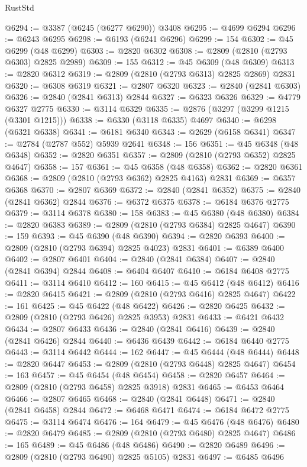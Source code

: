 \begin{lexlean}{RustStd}
\begin{coremodule}
{\begin{coremodule}
{{{{{{{{{{{{{{{{{{{{{{{{{{{{{{{{{@6294 := @3387 (@6245 (@6277 @6290)) @3408
@6295 := @4699 @6294
@6296 := @6243 @6295
@6298 := @6193 (@6241 @6296)
@6299 := 154
@6302 := @45 @6299 (@48 @6299)
@6303 := @2820 @6302
@6308 := @2809 (@2810 (@2793 @6303) @2825 @2989)
@6309 := 155
@6312 := @45 @6309 (@48 @6309)
@6313 := @2820 @6312
@6319 := @2809 (@2810 (@2793 @6313) @2825 @2869) @2831
@6320 := @6308 @6319
@6321 := @2807 @6320
@6323 := @2840 (@2841 @6303)
@6326 := @2840 (@2841 @6313) @2844
@6327 := @6323 @6326
@6329 := @4779 @6327 @2775
@6330 := @3114 @6329
@6335 := @2876 (@3297 (@3299 @1215 (@3301 @1215)))
@6338 := @6330 (@3118 @6335) @4697
@6340 := @6298 (@6321 @6338)
@6341 := @6181 @6340
@6343 := @2629 (@6158 @6341)
@6347 := @2784 (@2787 @552) @5939 @2641
@6348 := 156
@6351 := @45 @6348 (@48 @6348)
@6352 := @2820 @6351
@6357 := @2809 (@2810 (@2793 @6352) @2825 @4647)
@6358 := 157
@6361 := @45 @6358 (@48 @6358)
@6362 := @2820 @6361
@6368 := @2809 (@2810 (@2793 @6362) @2825 @4163) @2831
@6369 := @6357 @6368
@6370 := @2807 @6369
@6372 := @2840 (@2841 @6352)
@6375 := @2840 (@2841 @6362) @2844
@6376 := @6372 @6375
@6378 := @6184 @6376 @2775
@6379 := @3114 @6378
@6380 := 158
@6383 := @45 @6380 (@48 @6380)
@6384 := @2820 @6383
@6389 := @2809 (@2810 (@2793 @6384) @2825 @4647)
@6390 := 159
@6393 := @45 @6390 (@48 @6390)
@6394 := @2820 @6393
@6400 := @2809 (@2810 (@2793 @6394) @2825 @4023) @2831
@6401 := @6389 @6400
@6402 := @2807 @6401
@6404 := @2840 (@2841 @6384)
@6407 := @2840 (@2841 @6394) @2844
@6408 := @6404 @6407
@6410 := @6184 @6408 @2775
@6411 := @3114 @6410
@6412 := 160
@6415 := @45 @6412 (@48 @6412)
@6416 := @2820 @6415
@6421 := @2809 (@2810 (@2793 @6416) @2825 @4647)
@6422 := 161
@6425 := @45 @6422 (@48 @6422)
@6426 := @2820 @6425
@6432 := @2809 (@2810 (@2793 @6426) @2825 @3953) @2831
@6433 := @6421 @6432
@6434 := @2807 @6433
@6436 := @2840 (@2841 @6416)
@6439 := @2840 (@2841 @6426) @2844
@6440 := @6436 @6439
@6442 := @6184 @6440 @2775
@6443 := @3114 @6442
@6444 := 162
@6447 := @45 @6444 (@48 @6444)
@6448 := @2820 @6447
@6453 := @2809 (@2810 (@2793 @6448) @2825 @4647)
@6454 := 163
@6457 := @45 @6454 (@48 @6454)
@6458 := @2820 @6457
@6464 := @2809 (@2810 (@2793 @6458) @2825 @3918) @2831
@6465 := @6453 @6464
@6466 := @2807 @6465
@6468 := @2840 (@2841 @6448)
@6471 := @2840 (@2841 @6458) @2844
@6472 := @6468 @6471
@6474 := @6184 @6472 @2775
@6475 := @3114 @6474
@6476 := 164
@6479 := @45 @6476 (@48 @6476)
@6480 := @2820 @6479
@6485 := @2809 (@2810 (@2793 @6480) @2825 @4647)
@6486 := 165
@6489 := @45 @6486 (@48 @6486)
@6490 := @2820 @6489
@6496 := @2809 (@2810 (@2793 @6490) @2825 @5105) @2831
@6497 := @6485 @6496
}}}}}}}}}}}}}}}}}}}}}}}}}}}}}}}}}
\end{coremodule}}
\end{coremodule}
\end{lexlean}

